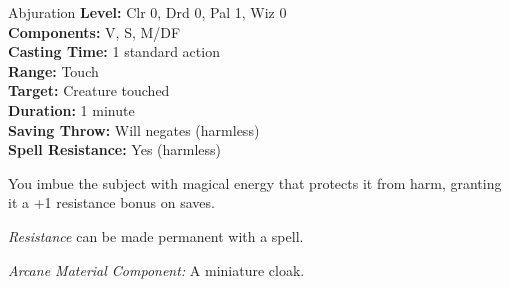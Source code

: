 {Abjuration}
{
	\textbf{Level:}
	Clr 0, Drd 0, Pal 1, Wiz 0\\
	\textbf{Components:}
	V, S, M/DF\\
	\textbf{Casting Time:}
	1 standard action\\
	\textbf{Range:}
	Touch\\
	\textbf{Target:}
	Creature touched\\
	\textbf{Duration:}
	1 minute\\
	\textbf{Saving Throw:}
	Will negates (harmless)\\
	\textbf{Spell Resistance:}
	Yes (harmless)\\
}
{
	You imbue the subject with magical energy that protects it from harm, granting it a +1 resistance bonus on saves.

	\emph{Resistance} can be made permanent with a  spell.

	\textit{Arcane Material Component:}
	A miniature cloak.

}
